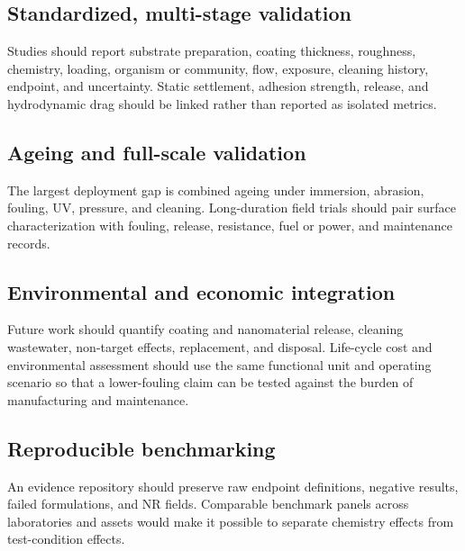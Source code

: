 \subsection{Standardized, multi-stage validation}
Studies should report substrate preparation, coating thickness, roughness, chemistry, loading, organism or community, flow, exposure, cleaning history, endpoint, and uncertainty. Static settlement, adhesion strength, release, and hydrodynamic drag should be linked rather than reported as isolated metrics.

\subsection{Ageing and full-scale validation}
The largest deployment gap is combined ageing under immersion, abrasion, fouling, UV, pressure, and cleaning. Long-duration field trials should pair surface characterization with fouling, release, resistance, fuel or power, and maintenance records.

\subsection{Environmental and economic integration}
Future work should quantify coating and nanomaterial release, cleaning wastewater, non-target effects, replacement, and disposal. Life-cycle cost and environmental assessment should use the same functional unit and operating scenario so that a lower-fouling claim can be tested against the burden of manufacturing and maintenance.

\subsection{Reproducible benchmarking}
An evidence repository should preserve raw endpoint definitions, negative results, failed formulations, and NR fields. Comparable benchmark panels across laboratories and assets would make it possible to separate chemistry effects from test-condition effects.
